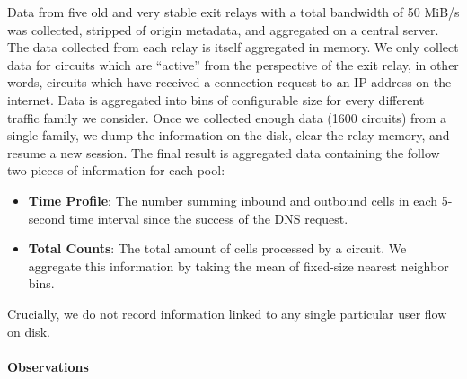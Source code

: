 Data from five old and very stable exit relays with a total bandwidth of 50
MiB/s was collected, stripped of origin metadata, and aggregated on a central
server. The data collected from each relay is itself aggregated in memory. We
only collect data for circuits which are ``active'' from the perspective of the
exit relay, in other words, circuits which have received a connection request to
an IP address on the internet.
Data is aggregated into bins of configurable size for every different traffic
family we consider. Once we collected enough data (1600 circuits) from a single
family, we dump the information on the disk, clear the relay memory, and resume
a new session. The final result is aggregated data containing the follow two
pieces of information for each pool:

\begin{itemize}
\item \textbf{Time Profile}: The number summing inbound and outbound cells in each
  5-second time interval since the success of the DNS request.

\item \textbf{Total Counts}: The total amount of cells processed by a circuit.
  We aggregate this information by taking the mean of fixed-size nearest
  neighbor bins.
\end{itemize}

Crucially, we do not record information linked to any single particular user
flow on disk.

\paragraph*{Observations}


